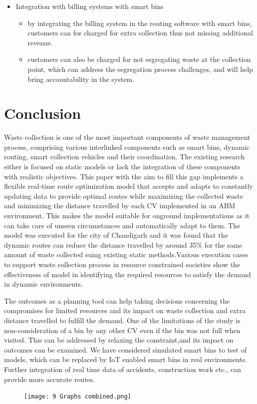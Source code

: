 \documentclass[12pt]{article}
\begin{document}
\begin{itemize}
\begin{itemize}
\begin{itemize}
 \end{itemize}
 \item Integration with billing systems with smart bins
   \begin{itemize}
 \item by integrating the billing system in the routing software with smart bins, customers can for charged for extra collection thus not missing additional revenue. \item customers can also be charged for not segregating waste at the collection point, which can address the segregation process challenges, and will help bring accountability in the system.
\end{itemize}
\end{itemize}
\end{itemize}
\section{Conclusion}
Waste collection is one of the most important components of waste management process, comprising various interlinked components such as smart bins, dynamic routing, smart collection vehicles and their coordination. The existing research either is focused on static models or lack the integration of these components with realistic objectives. This paper with the aim to fill this gap implements a flexible real-time route optimization model that accepts and adapts to constantly updating data to provide optimal routes while maximizing the collected waste and minimizing the distance travelled by each CV implemented in an ABM environment. This makes the model suitable for onground implementations as it can take care of unseen circumstances and automatically adapt to them. The model was executed for the city of Chandigarh and it was found that the dynamic routes can reduce the distance travelled by around 35\% for the same amount of waste collected suing existing static methods.Various execution cases to support waste collection process in resource constrained societies show the effectiveness of model in identifying the required resources to satisfy the demand in dynamic environments. 

The outcomes as a planning tool can help taking decisions concerning the compromises for limited resources and its impact on waste collection and extra distance travelled to fulfill the demand. One of the limitations of the study is non-consideration of a bin by any other CV even if the bin was not full when visited. This can be addressed by relaxing the constraint,and its impact on outcomes can be examined. We have considered simulated smart bins to test of models, which can be replaced by IoT enabled smart bins in real environments. Further integration of real time data of  accidents, construction work etc., can provide more accurate routes.






\begin{figure}[H]
	\centering
	\texttt{[image: 9 Graphs combined.png]}\label{ABCD}
\end{figure}
\end{document}
